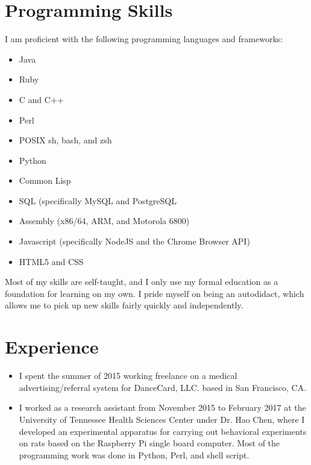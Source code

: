 \documentclass{article}
\begin{document}
\begin{singlespace}
\begin{flushleft}
  \section*{Programming Skills}
  I am proficient with the following programming languages and frameworks:
  \begin{itemize}
  \item Java
  \item Ruby
  \item C and C++
  \item Perl
  \item POSIX sh, bash, and zsh
  \item Python
  \item Common Lisp
  \item SQL (specifically MySQL and PostgreSQL
  \item Assembly (x86/64, ARM, and Motorola 6800)
  \item Javascript (specifically NodeJS and the Chrome Browser API)
  \item HTML5 and CSS
  \end{itemize}
  Most of my skills are self-taught, and I only use my formal education as a foundation for learning on my own. I pride myself on being an autodidact, which allows me to pick up new skills fairly quickly and independently.
  \section*{Experience}
  \begin{itemize}
  \item I spent the summer of 2015 working freelance on a medical advertising/referral system for DanceCard, LLC. based in San Francisco, CA.
  \item I worked as a research assistant from November 2015 to February 2017 at the University of Tennessee Health Sciences Center under Dr. Hao Chen, where I developed an experimental apparatus for carrying out behavioral experiments on rats based on the Raspberry Pi single board computer. Most of the programming work was done in Python, Perl, and shell script.
  \end{itemize}
\end{flushleft}
\end{singlespace}
\end{document}
